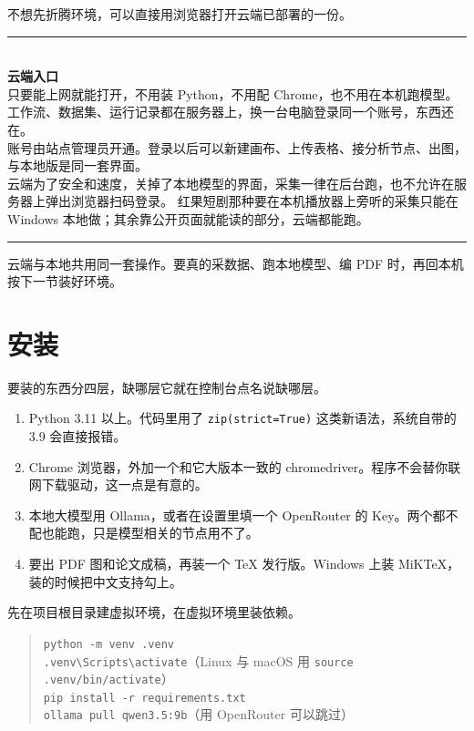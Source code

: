 \documentclass[a4paper]{article}
\begin{document}
不想先折腾环境，可以直接用浏览器打开云端已部署的一份。

\begin{center}
\begin{minipage}{0.92\textwidth}
\rule{\linewidth}{0.4pt}\\[5pt]
{\bfseries 云端入口}\\[5pt]
只要能上网就能打开，不用装 Python，不用配 Chrome，也不用在本机跑模型。
工作流、数据集、运行记录都在服务器上，换一台电脑登录同一个账号，东西还在。\\[3pt]
账号由站点管理员开通。登录以后可以新建画布、上传表格、接分析节点、出图，与本地版是同一套界面。\\[3pt]
云端为了安全和速度，关掉了本地模型的界面，采集一律在后台跑，也不允许在服务器上弹出浏览器扫码登录。
红果短剧那种要在本机播放器上旁听的采集只能在 Windows 本地做；其余靠公开页面就能读的部分，云端都能跑。\\[4pt]
\rule{\linewidth}{0.4pt}
\end{minipage}
\end{center}

云端与本地共用同一套操作。要真的采数据、跑本地模型、编 PDF 时，再回本机按下一节装好环境。

\section{安装}

要装的东西分四层，缺哪层它就在控制台点名说缺哪层。

\begin{enumerate}
\item Python 3.11 以上。代码里用了 \texttt{zip(strict=True)} 这类新语法，系统自带的 3.9 会直接报错。
\item Chrome 浏览器，外加一个和它大版本一致的 chromedriver。程序不会替你联网下载驱动，这一点是有意的。
\item 本地大模型用 Ollama，或者在设置里填一个 OpenRouter 的 Key。两个都不配也能跑，只是模型相关的节点用不了。
\item 要出 PDF 图和论文成稿，再装一个 TeX 发行版。Windows 上装 MiKTeX，装的时候把中文支持勾上。
\end{enumerate}

先在项目根目录建虚拟环境，在虚拟环境里装依赖。

\begin{quote}\small
\texttt{python -m venv .venv}\\
\texttt{.venv\textbackslash Scripts\textbackslash activate}（Linux 与 macOS 用 \texttt{source .venv/bin/activate}）\\
\texttt{pip install -r requirements.txt}\\
\texttt{ollama pull qwen3.5:9b}（用 OpenRouter 可以跳过）
\end{quote}
\end{document}
